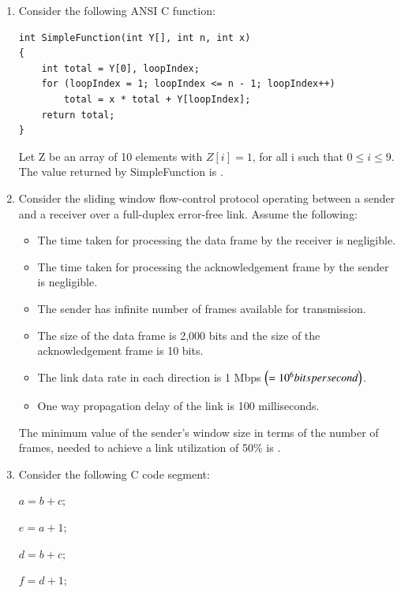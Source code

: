 \documentclass[a4paper, 11pt]{article}
\begin{document}
\begin{enumerate}
    \item Consider the following ANSI C function:
    \begin{verbatim}
int SimpleFunction(int Y[], int n, int x)
{
    int total = Y[0], loopIndex;
    for (loopIndex = 1; loopIndex <= n - 1; loopIndex++)
        total = x * total + Y[loopIndex];
    return total;
}
    \end{verbatim}
    Let Z be an array of 10 elements with $Z[i]=1$, for all i such that $0 \le i \le 9$. The value returned by SimpleFunction  is \underline{\hspace{2cm}}.
    
    \hfill{}
    
    \item Consider the sliding window flow-control protocol operating between a sender and a receiver over a full-duplex error-free link. Assume the following:
    \begin{itemize}
        \item The time taken for processing the data frame by the receiver is negligible.
        \item The time taken for processing the acknowledgement frame by the sender is negligible.
        \item The sender has infinite number of frames available for transmission.
        \item The size of the data frame is 2,000 bits and the size of the acknowledgement frame is 10 bits.
        \item The link data rate in each direction is 1 Mbps $\left(=10^6 bits per second\right)$.
        \item One way propagation delay of the link is 100 milliseconds.
    \end{itemize}
    The minimum value of the sender's window size in terms of the number of frames,  needed to achieve a link utilization of 50\% is \underline{\hspace{2cm}}.
    
    \hfill{}
    
    \item Consider the following C code segment:
    
    $a = b + c;$
    
    $e = a + 1;$
    
    $d = b + c;$
    
    $f = d + 1;$
    

\end{enumerate}
\end{document}
